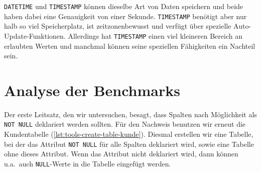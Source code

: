 \texttt{DATETIME} und \texttt{TIMESTAMP} können dieselbe Art von Daten speichern und beide haben dabei eine Genauigkeit von einer Sekunde.
\texttt{TIMESTAMP} benötigt aber nur halb so viel Speicherplatz, ist zeitzonenbewusst und verfügt über spezielle Auto-Update-Funktionen.
Allerdings hat \texttt{TIMESTAMP} einen viel kleineren Bereich an erlaubten Werten und manchmal können seine speziellen Fähigkeiten ein Nachteil sein.

\section{Analyse der Benchmarks}\label{sec:data-types-analyse-der-benchmarks}

Der erste Leitsatz, den wir untersuchen, besagt, dass Spalten nach Möglichkeit als \texttt{NOT NULL} deklariert werden sollten.
Für den Nachweis benutzen wir erneut die Kundentabelle (\ref{lst:tools-create-table-kunde}).
Diesmal erstellen wir eine Tabelle, bei der das Attribut \texttt{NOT NULL} für alle Spalten deklariert wird, sowie eine Tabelle ohne dieses Attribut.
Wenn das Attribut nicht deklariert wird, dann können u.a.\ auch \texttt{NULL}-Werte in die Tabelle eingefügt werden.

